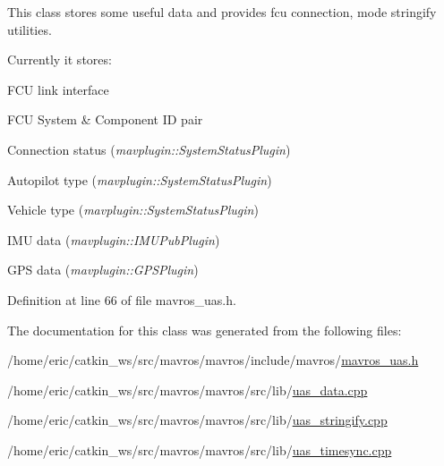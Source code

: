 This class stores some useful data and provides fcu connection, mode stringify utilities.

Currently it stores\+:
\begin{DoxyItemize}
\item F\+CU link interface
\item F\+CU System \& Component ID pair
\item Connection status ({\itshape mavplugin\+::\+System\+Status\+Plugin})
\item Autopilot type ({\itshape mavplugin\+::\+System\+Status\+Plugin})
\item Vehicle type ({\itshape mavplugin\+::\+System\+Status\+Plugin})
\item I\+MU data ({\itshape mavplugin\+::\+I\+M\+U\+Pub\+Plugin})
\item G\+PS data ({\itshape mavplugin\+::\+G\+P\+S\+Plugin}) 
\end{DoxyItemize}

Definition at line 66 of file mavros\+\_\+uas.\+h.



The documentation for this class was generated from the following files\+:\begin{DoxyCompactItemize}
\item 
/home/eric/catkin\+\_\+ws/src/mavros/mavros/include/mavros/\mbox{\hyperlink{mavros__uas_8h}{mavros\+\_\+uas.\+h}}\item 
/home/eric/catkin\+\_\+ws/src/mavros/mavros/src/lib/\mbox{\hyperlink{uas__data_8cpp}{uas\+\_\+data.\+cpp}}\item 
/home/eric/catkin\+\_\+ws/src/mavros/mavros/src/lib/\mbox{\hyperlink{uas__stringify_8cpp}{uas\+\_\+stringify.\+cpp}}\item 
/home/eric/catkin\+\_\+ws/src/mavros/mavros/src/lib/\mbox{\hyperlink{uas__timesync_8cpp}{uas\+\_\+timesync.\+cpp}}\end{DoxyCompactItemize}
